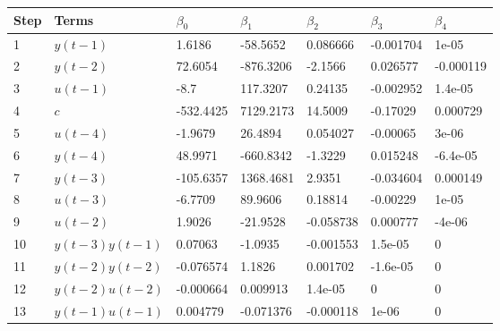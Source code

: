 \begin{tabular}{lllllll}
Step & Terms & $\beta_{0}$ & $\beta_{1}$ & $\beta_{2}$ & $\beta_{3}$ & $\beta_{4}$ \\ 
\hline 
1 & $y(t-1)$ & 1.6186 & -58.5652 & 0.086666 & -0.001704 & 1e-05 \\ 
2 & $y(t-2)$ & 72.6054 & -876.3206 & -2.1566 & 0.026577 & -0.000119 \\ 
3 & $u(t-1)$ & -8.7 & 117.3207 & 0.24135 & -0.002952 & 1.4e-05 \\ 
4 & $c$ & -532.4425 & 7129.2173 & 14.5009 & -0.17029 & 0.000729 \\ 
5 & $u(t-4)$ & -1.9679 & 26.4894 & 0.054027 & -0.00065 & 3e-06 \\ 
6 & $y(t-4)$ & 48.9971 & -660.8342 & -1.3229 & 0.015248 & -6.4e-05 \\ 
7 & $y(t-3)$ & -105.6357 & 1368.4681 & 2.9351 & -0.034604 & 0.000149 \\ 
8 & $u(t-3)$ & -6.7709 & 89.9606 & 0.18814 & -0.00229 & 1e-05 \\ 
9 & $u(t-2)$ & 1.9026 & -21.9528 & -0.058738 & 0.000777 & -4e-06 \\ 
10 & $y(t-3)y(t-1)$ & 0.07063 & -1.0935 & -0.001553 & 1.5e-05 & 0 \\ 
11 & $y(t-2)y(t-2)$ & -0.076574 & 1.1826 & 0.001702 & -1.6e-05 & 0 \\ 
12 & $y(t-2)u(t-2)$ & -0.000664 & 0.009913 & 1.4e-05 & 0 & 0 \\ 
13 & $y(t-1)u(t-1)$ & 0.004779 & -0.071376 & -0.000118 & 1e-06 & 0 \\ 
\hline 
\end{tabular}